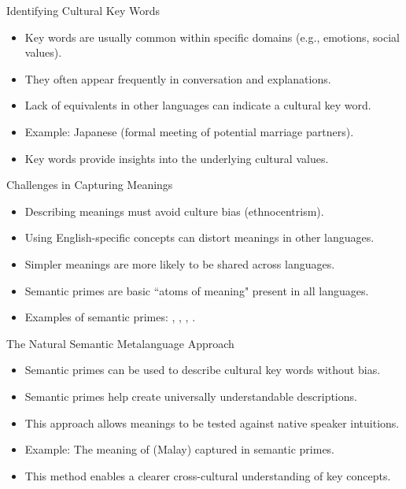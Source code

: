 \documentclass{beamer}
\begin{document}
\begin{frame}{Identifying Cultural Key Words}
    \begin{itemize}
        \item Key words are usually common within specific domains (e.g., emotions, social values).
        \item They often appear frequently in conversation and explanations.
        \item Lack of equivalents in other languages can indicate a cultural key word.
        \item Example: Japanese  (formal meeting of potential marriage partners).
        \item Key words provide insights into the underlying cultural values.
    \end{itemize}
\end{frame}

\begin{frame}{Challenges in Capturing Meanings}
    \begin{itemize}
        \item Describing meanings must avoid culture bias (ethnocentrism).
        \item Using English-specific concepts can distort meanings in other languages.
        \item Simpler meanings are more likely to be shared across languages.
        \item Semantic primes are basic ``atoms of meaning" present in all languages.
        \item Examples of semantic primes: , , , .
    \end{itemize}
\end{frame}

\begin{frame}{The Natural Semantic Metalanguage Approach}
    \begin{itemize}
        \item Semantic primes can be used to describe cultural key words without bias.
        \item Semantic primes help create universally understandable descriptions.
        \item This approach allows meanings to be tested against native speaker intuitions.
        \item Example: The meaning of  (Malay) captured in semantic primes.
        \item This method enables a clearer cross-cultural understanding of key concepts.
    \end{itemize}
\end{frame}
\end{document}
